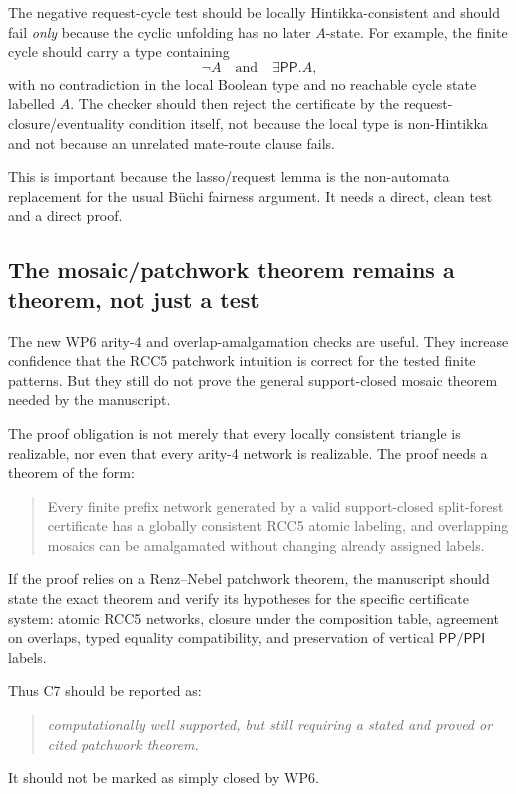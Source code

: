 \documentclass[11pt]{article}
\newcommand{\PP}{\mathsf{PP}}
\newcommand{\PPI}{\mathsf{PPI}}
\begin{document}
The negative request-cycle test should be locally Hintikka-consistent and should
fail \emph{only} because the cyclic unfolding has no later \(A\)-state.  For
example, the finite cycle should carry a type containing
\[
  \neg A \quad\text{and}\quad \exists\PP.A,
\]
with no contradiction in the local Boolean type and no reachable cycle state
labelled \(A\).  The checker should then reject the certificate by the
request-closure/eventuality condition itself, not because the local type is
non-Hintikka and not because an unrelated mate-route clause fails.

This is important because the lasso/request lemma is the non-automata
replacement for the usual Büchi fairness argument.  It needs a direct, clean test
and a direct proof.

\subsection{The mosaic/patchwork theorem remains a theorem, not just a test}

The new WP6 arity-4 and overlap-amalgamation checks are useful.  They increase
confidence that the RCC5 patchwork intuition is correct for the tested finite
patterns.  But they still do not prove the general support-closed mosaic theorem
needed by the manuscript.

The proof obligation is not merely that every locally consistent triangle is
realizable, nor even that every arity-4 network is realizable.  The proof needs a
theorem of the form:
\begin{quote}
Every finite prefix network generated by a valid support-closed split-forest
certificate has a globally consistent RCC5 atomic labeling, and overlapping
mosaics can be amalgamated without changing already assigned labels.
\end{quote}

If the proof relies on a Renz--Nebel patchwork theorem, the manuscript should
state the exact theorem and verify its hypotheses for the specific certificate
system: atomic RCC5 networks, closure under the composition table, agreement on
overlaps, typed equality compatibility, and preservation of vertical
\(\PP/\PPI\) labels.

Thus C7 should be reported as:
\begin{quote}
\emph{computationally well supported, but still requiring a stated and proved or
cited patchwork theorem.}
\end{quote}
It should not be marked as simply closed by WP6.
\end{document}
